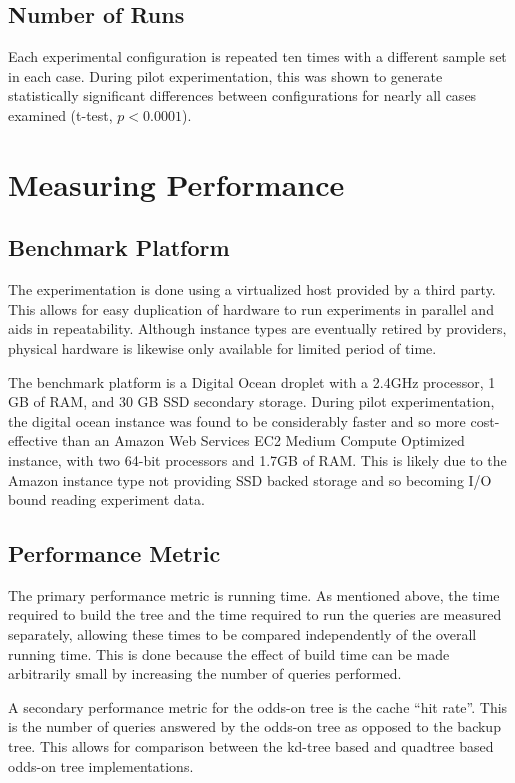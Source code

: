 \documentclass[mcs]{scsthesis}
\begin{document}
\subsection{Number of Runs}

Each experimental configuration is repeated ten times with a different sample
set in each case. During pilot experimentation, this was shown to generate
statistically significant differences between configurations for nearly all cases
examined (t-test, $p < 0.0001 $).

\section{Measuring Performance}

\subsection{Benchmark Platform}

The experimentation is done using a virtualized host provided by a third party.
This allows for easy duplication of hardware to run experiments in parallel and
aids in repeatability. Although instance types are eventually retired by
providers, physical hardware is likewise only available for limited period of
time.

The benchmark platform is a Digital Ocean droplet with a 2.4GHz processor, 1 GB
of RAM, and 30 GB SSD secondary storage. During pilot experimentation, the
digital ocean instance was found to be considerably faster and so more
cost-effective than an Amazon Web Services EC2 Medium Compute Optimized
instance, with two 64-bit processors and 1.7GB of RAM. This is likely due to the
Amazon instance type not providing SSD backed storage and so becoming I/O bound 
reading experiment data. 

\subsection{Performance Metric}

The primary performance metric is running time. As mentioned above, the time
required to build the tree and the time required to run the queries are measured
separately, allowing these times to be compared independently of the overall
running time. This is done because the effect of build time can be made
arbitrarily small by increasing the number of queries performed.

A secondary performance metric for the odds-on tree is the cache ``hit rate''.
This is the number of queries answered by the odds-on tree as opposed to the
backup tree. This allows for comparison between the kd-tree based and quadtree
based odds-on tree implementations. 
\end{document}
